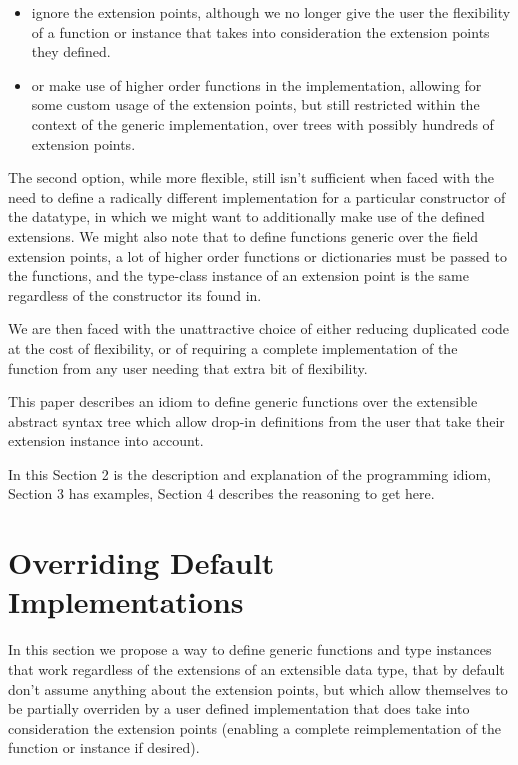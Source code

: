 \documentclass{article}
\begin{document}
\begin{itemize}
    \item ignore the extension points, although we no longer give the user the
        flexibility of a function or instance that takes into consideration the
        extension points they defined.

    \item or make use of higher order functions in the implementation, allowing for some
        custom usage of the extension points, but still restricted within the
        context of the generic implementation, over trees with possibly hundreds
        of extension points.
\end{itemize}

The second option, while more flexible, still isn't sufficient when faced with
the need to define a radically different implementation for a particular
constructor of the datatype, in which we might want to additionally make use of
the defined extensions. We might also note that to define functions generic over
the field extension points, a lot of higher order functions or dictionaries must
be passed to the functions, and the type-class instance of an extension point is
the same regardless of the constructor its found in.

We are then faced with the unattractive choice of either reducing duplicated
code at the cost of flexibility, or of requiring a complete implementation of the
function from any user needing that extra bit of flexibility.

This paper describes an idiom to define generic functions over the extensible
abstract syntax tree which allow drop-in definitions from the user that take
their extension instance into account.

In this Section 2 is the description and explanation of the programming idiom,
Section 3 has examples, Section 4 describes the reasoning to get here.

\section{Overriding Default Implementations}

In this section we propose a way to define generic functions and type instances
that work regardless of the extensions of an extensible data type, that by
default don't assume anything about the extension points, but which allow
themselves to be partially overriden by a user defined implementation that does
take into consideration the extension points (enabling a complete
reimplementation of the function or instance if desired).
\end{document}
